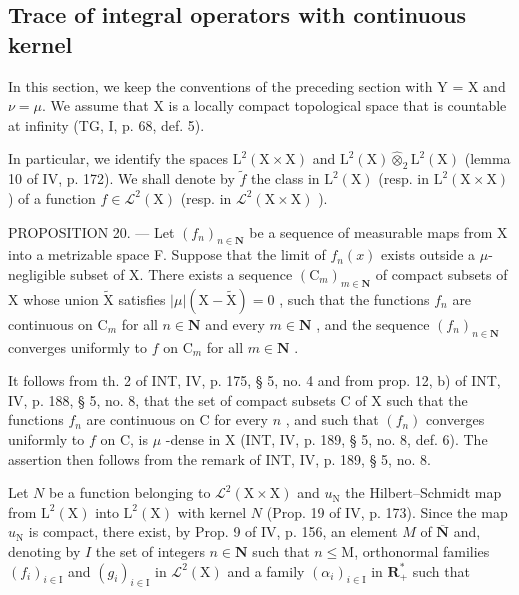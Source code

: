 \subsection{Trace of integral operators with continuous kernel}

In this section, we keep the conventions of the preceding section with Y = X and \(\nu = \mu\). We assume that X is a locally compact topological space that is countable at infinity (TG, I, p. 68, def. 5).

In particular, we identify the spaces \(\mathrm{L}^{2}(\mathrm{X}\times\mathrm{X})\) and \(\mathrm{L}^{2}(\mathrm{X})\widehat{\otimes}_{2}\mathrm{L}^{2}(\mathrm{X})\) (lemma 10 of IV, p. 172). We shall denote by \(\widetilde{f}\) the class in \(\mathrm{L}^{2}(\mathrm{X})\) (resp. in \(\mathrm{L}^{2}(\mathrm{X}\times\mathrm{X})\) ) of a function \(f\in\mathcal{L}^{2}(\mathrm{X})\) (resp. in \(\mathcal{L}^{2}(\mathrm{X}\times\mathrm{X})\) ).

PROPOSITION 20. --- Let \((f_n)_{n \in \mathbf{N}}\) be a sequence of measurable maps from X into a metrizable space F. Suppose that the limit of \(f_n(x)\) exists outside a \(\mu\)-negligible subset of X. There exists a sequence \((\mathrm{C}_m)_{m \in \mathbf{N}}\) of compact subsets of X whose union \(\widetilde{\mathrm{X}}\) satisfies \(|\mu|(\mathrm{X} - \widetilde{\mathrm{X}}) = 0\) , such that the functions \(f_n\) are continuous on \(\mathrm{C}_m\) for all \(n \in \mathbf{N}\) and every \(m \in \mathbf{N}\) , and the sequence \((f_n)_{n \in \mathbf{N}}\) converges uniformly to \(f\) on \(\mathrm{C}_m\) for all \(m \in \mathbf{N}\) .

It follows from th. 2 of INT, IV, p. 175, § 5, no. 4 and from prop. 12, b) of INT, IV, p. 188, § 5, no. 8, that the set of compact subsets C of X such that the functions \(f_n\) are continuous on C for every \(n\) , and such that \((f_n)\) converges uniformly to \(f\) on C, is \(\mu\) -dense in X (INT, IV, p. 189, § 5, no. 8, def. 6). The assertion then follows from the remark of INT, IV, p. 189, § 5, no. 8.

Let \(N\) be a function belonging to \(\mathcal{L}^2 (\mathrm{X}\times \mathrm{X})\) and \(u_{\mathrm{N}}\) the Hilbert--Schmidt map from \(\mathrm{L}^2 (\mathrm{X})\) into \(\mathrm{L}^2 (\mathrm{X})\) with kernel \(N\) (Prop. 19 of IV, p. 173). Since the map \(u_{\mathrm{N}}\) is compact, there exist, by Prop. 9 of IV, p. 156, an element \(M\) of \(\overline{\mathbf{N}}\) and, denoting by \(I\) the set of integers \(n\in \mathbf{N}\) such that \(n\leqslant \mathrm{M}\), orthonormal families \((f_i)_{i\in \mathrm{I}}\) and \((g_{i})_{i\in \mathrm{I}}\) in \(\mathcal{L}^2 (\mathrm{X})\) and a family \((\alpha_{i})_{i\in \mathrm{I}}\) in \(\mathbf{R}_+^*\) such that

